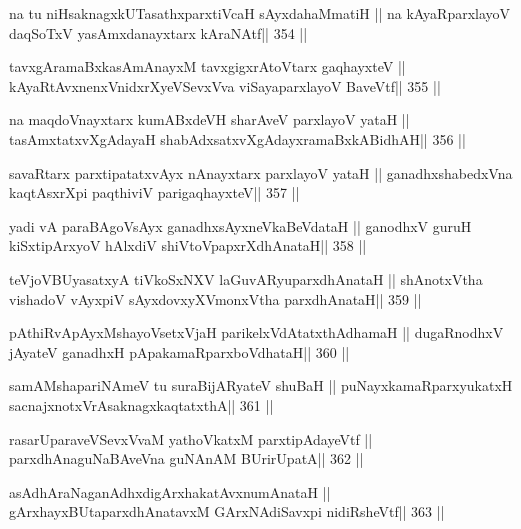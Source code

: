 \begin{shl}
na tu niHsaknagxkUTasathxparxtiVcaH sAyxdahaMmatiH ||
na kAyaRparxlayoV daqSoTxV yasAmxdanayxtarx kAraNAtf\hfill || 354 ||
\end{shl}

\begin{shl}
tavxgAramaBxkasAmAnayxM tavxgigxrA\s toV\s tarx gaqhayxteV ||
kAyaRtAvxnenxVnidxrXyeVSevxVva viSayaparxlayoV BaveVtf\hfill || 355 ||
\end{shl}

\begin{shl}
na maqdoV\s nayxtarx kumABxdeVH sharAveV parxlayoV yataH ||
tasAmxtatxvXgAdayaH shabAdxsatxvXgAdayxramaBxkABidhAH\hfill || 356 ||
\end{shl}

\begin{shl}
savaRtarx parxtipatatxvAyx nAnayxtarx parxlayoV yataH ||
ganadhxshabedxVna kaqtAsxrX\s pi paqthiviV parigaqhayxteV\hfill || 357 ||
\end{shl}

\begin{shl}
yadi vA paraBAgoV\s sAyx ganadhxsAyxneVkaBeVdataH ||
ganodhxV guruH kiSxtipArxyoV hAlxdiV shiVtoV\s papxrXdhAnataH\hfill || 358 ||
\end{shl}

\begin{shl}
teVjoVBUyasatxyA tiVkoSxNXV laGuvARyuparxdhAnataH ||
shAnotxV\s tha vishadoV vAyxpiV sAyxdovxyXVmonxV\s tha parxdhAnataH\hfill || 359 ||
\end{shl}

\begin{shl}
pAthiRvApAyxMshayoVsetxVjaH parikelxVdAtatxthA\s dhamaH ||
dugaRnodhxV jAyateV ganadhxH pApakamaRparxboVdhataH\hfill || 360 ||
\end{shl}

\begin{shl}
samAMshapariNAmeV tu suraBijARyateV shuBaH ||
puNayxkamaRparxyukatxH sacnajxnotxVrAsaknagxkaqtatxthA\hfill || 361 ||
\end{shl}

\begin{shl}
rasarUparaveVSevxVvaM yathoVkatxM parxtipAdayeVtf ||
parxdhAnaguNaBAveVna guNAnAM BUrirUpatA\hfill || 362 ||
\end{shl}

\begin{shl}
asAdhAraNaganAdhxdigArxhakatAvxnumAnataH ||
gArxhayxBUtaparxdhAnatavxM GArxNAdiSavxpi nidiRsheVtf\hfill || 363 ||
\end{shl}

